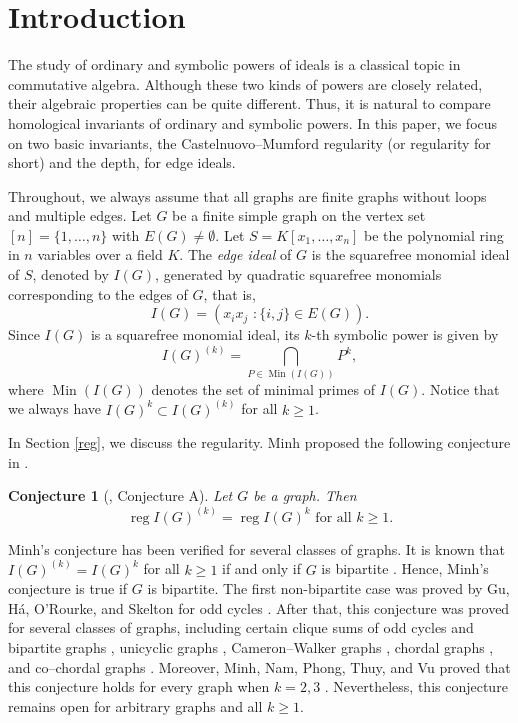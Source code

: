 \documentclass[12pt]{amsart}
\newtheorem{conj}[thm]{Conjecture}
\theoremstyle{definition}
\theoremstyle{remark}
\DeclareMathOperator{\reg}{reg}
\DeclareMathOperator{\Min}{Min}
\begin{document}
\maketitle


\section{Introduction}

The study of ordinary and symbolic powers of ideals is a classical topic in commutative algebra. Although these two kinds of powers are closely related, their algebraic properties can be quite different. Thus, it is natural to compare homological invariants of ordinary and symbolic powers. In this paper, we focus on two basic invariants, the Castelnuovo--Mumford regularity (or regularity for short) and the depth, for edge ideals.

Throughout, we always assume that all graphs are finite graphs without loops and multiple edges. Let $G$ be a finite simple graph on the vertex set $[n]=\{1,\ldots, n\}$ with $E(G)\neq\emptyset$. Let $S=K[x_{1},\ldots, x_{n}]$ be the polynomial ring  in $n$ variables over a field $K$. The {\it edge ideal} of $G$ is the squarefree monomial ideal of $S$, denoted by $I(G)$, generated by quadratic squarefree monomials corresponding to the edges of $G$, that is, 
$$I(G)=(x_{i}x_{j}\,\,: \{i,j\}\in E(G)).$$
Since $I(G)$ is a squarefree monomial ideal, its $k$-th symbolic power is given by 
$$I(G)^{(k)}=\bigcap_{P\in\Min(I(G))}P^{k},$$
where $\Min(I(G))$ denotes the set of minimal primes of $I(G)$. Notice that we always have $I(G)^{k}\subset I(G)^{(k)}$ for all $k\geq1$. 

In Section \ref{reg}, we discuss the regularity. Minh proposed the following conjecture in \cite{mnptv2022}. 

\begin{conj}[\cite{mnptv2022}, Conjecture A]
Let $G$ be a graph. Then $$\reg I(G)^{(k)}=\reg I(G)^{k}\mbox{ for all }k\geq1.$$
\end{conj}

Minh's conjecture has been verified for several classes of graphs. It is known that $I(G)^{(k)}=I(G)^{k}$ for all $k\geq1$ if and only if $G$ is bipartite \cite[Theorem 5.9]{svv1994}. Hence, Minh's conjecture is true if $G$ is bipartite. The first non-bipartite case was proved by Gu, H\'{a}, O'Rourke, and Skelton for odd cycles \cite[Theorem 5.3]{ghrs2020}. After that, this conjecture was proved for several classes of graphs, including certain clique sums of odd cycles and bipartite graphs \cite{jk2020}, unicyclic graphs \cite[Theorem 3.9]{sf2020unicyclic}, Cameron--Walker graphs \cite{sf2020cw}, chordal graphs \cite{sf2022chordal}, and co--chordal graphs \cite{an2026}. Moreover, Minh, Nam, Phong, Thuy, and Vu proved that this conjecture holds for every graph when $k=2,3$ \cite{mnptv2022}. Nevertheless, this conjecture remains open for arbitrary graphs and all $k\geq1$. 
\end{document}
